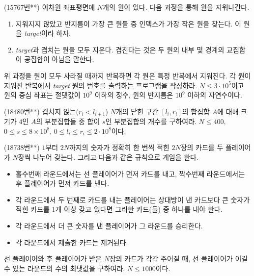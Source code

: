 \begin{problem}
    (15767번**) 이차원 좌표평면에 $N$개의 원이 있다. 다음 과정을 통해 원을 지워나간다.
    \begin{enumerate}
        \item 지워지지 않았고 반지름이 가장 큰 원들 중 인덱스가 가장 작은 원을 찾는다. 이 원을 \textit{target}이라 하자.
        \item \textit{target}과 겹치는 원을 모두 지운다. 겹친다는 것은 두 원의 내부 및 경계의 교집합이 공집합이 아님을 말한다.
    \end{enumerate}
    위 과정을 원이 모두 사라질 때까지 반복하면 각 원은 특정 반복에서 지워진다. 각 원이 지워진 반복에서 \textit{target} 원의 번호를 출력하는 프로그램을 작성하라. $N \leq 3 \cdot 10^5$이고 원의 중심 좌표는 절댓값이 $10^9$ 이하의 정수, 원의 반지름은 $10^9$ 이하의 자연수이다.
\end{problem}

\begin{problem}
    (18480번**) 겹치지 않는($r_i < l_{i+1}$) $N$개의 닫힌 구간 $[l_i, r_i]$의 합집합 $A$에 대해 크기가 $4$인 $A$의 부분집합들 중 합이 $s$인 부분집합의 개수를 구하여라. $N \leq 400$, $0 \leq s \leq 8 \times 10^8$, $0 \leq l_i \leq r_i \leq 2 \cdot 10^8$이다.
\end{problem}

\begin{problem}
    (18738번**) $1$부터 $2N$까지의 숫자가 정확히 한 번씩 적힌 $2N$장의 카드를 두 플레이어가 $N$장씩 나누어 갖는다. 그리고 다음과 같은 규칙으로 게임을 한다.
    \begin{itemize}
        \item 홀수번째 라운드에서는 선 플레이어가 먼저 카드를 내고, 짝수번째 라운드에서는 후 플레이어가 먼저 카드를 낸다.
        \item 각 라운드에서 두 번째로 카드를 내는 플레이어는 상대방이 낸 카드보다 큰 숫자가 적힌 카드를 1개 이상 갖고 있다면 그러한 카드(들) 중 하나를 내야 한다.
        \item 각 라운드에서 더 큰 숫자를 낸 플레이어가 그 라운드를 승리한다.
        \item 각 라운드에서 제출한 카드는 제거된다.
    \end{itemize}
    선 플레이어와 후 플레이어가 받은 $N$장의 카드가 각각 주어질 때, 선 플레이어가 이길 수 있는 라운드의 수의 최댓값을 구하여라. $N \leq 1000$이다.
\end{problem}

\newpage

